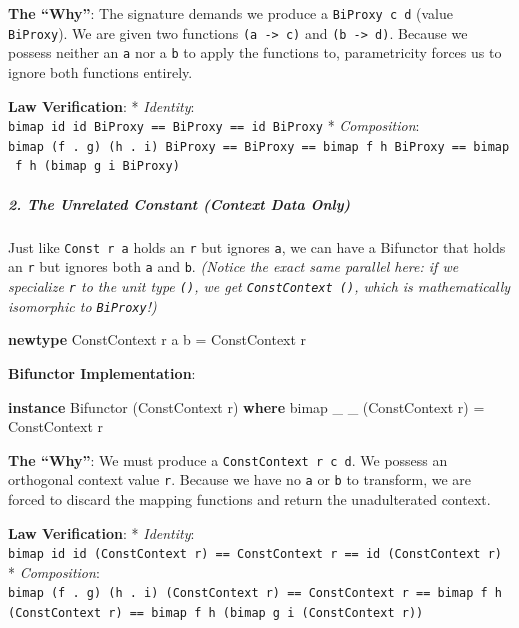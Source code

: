 \documentclass[
]{article}
\newenvironment{Shaded}{}{}
\newcommand{\DataTypeTok}[1]{\textcolor[rgb]{0.56,0.13,0.00}{#1}}
\newcommand{\KeywordTok}[1]{\textcolor[rgb]{0.00,0.44,0.13}{\textbf{#1}}}
\newcommand{\NormalTok}[1]{#1}
\newcommand{\OtherTok}[1]{\textcolor[rgb]{0.00,0.44,0.13}{#1}}
\begin{document}
\textbf{The ``Why''}: The signature demands we produce a
\texttt{BiProxy\ c\ d} (value \texttt{BiProxy}). We are given two
functions \texttt{(a\ -\textgreater{}\ c)} and
\texttt{(b\ -\textgreater{}\ d)}. Because we possess neither an
\texttt{a} nor a \texttt{b} to apply the functions to, parametricity
forces us to ignore both functions entirely.

\textbf{Law Verification}: * \emph{Identity}:
\texttt{bimap\ id\ id\ BiProxy\ ==\ BiProxy\ ==\ id\ BiProxy} *
\emph{Composition}:
\texttt{bimap\ (f\ .\ g)\ (h\ .\ i)\ BiProxy\ ==\ BiProxy\ ==\ bimap\ f\ h\ BiProxy\ ==\ bimap\ f\ h\ (bimap\ g\ i\ BiProxy)}

\subparagraph{2. The Unrelated Constant (Context Data
Only)}\label{the-unrelated-constant-context-data-only}

Just like \texttt{Const\ r\ a} holds an \texttt{r} but ignores
\texttt{a}, we can have a Bifunctor that holds an \texttt{r} but ignores
both \texttt{a} and \texttt{b}. \emph{(Notice the exact same parallel
here: if we specialize \texttt{r} to the unit type \texttt{()}, we get
\texttt{ConstContext\ ()}, which is mathematically isomorphic to
\texttt{BiProxy}!)}

\begin{Shaded}
\begin{Highlighting}[]
\KeywordTok{newtype} \DataTypeTok{ConstContext}\NormalTok{ r a b }\OtherTok{=} \DataTypeTok{ConstContext}\NormalTok{ r}
\end{Highlighting}
\end{Shaded}

\textbf{Bifunctor Implementation}:

\begin{Shaded}
\begin{Highlighting}[]
\KeywordTok{instance} \DataTypeTok{Bifunctor}\NormalTok{ (}\DataTypeTok{ConstContext}\NormalTok{ r) }\KeywordTok{where}
\NormalTok{    bimap \_ \_ (}\DataTypeTok{ConstContext}\NormalTok{ r) }\OtherTok{=} \DataTypeTok{ConstContext}\NormalTok{ r}
\end{Highlighting}
\end{Shaded}

\textbf{The ``Why''}: We must produce a \texttt{ConstContext\ r\ c\ d}.
We possess an orthogonal context value \texttt{r}. Because we have no
\texttt{a} or \texttt{b} to transform, we are forced to discard the
mapping functions and return the unadulterated context.

\textbf{Law Verification}: * \emph{Identity}:
\texttt{bimap\ id\ id\ (ConstContext\ r)\ ==\ ConstContext\ r\ ==\ id\ (ConstContext\ r)}
* \emph{Composition}:
\texttt{bimap\ (f\ .\ g)\ (h\ .\ i)\ (ConstContext\ r)\ ==\ ConstContext\ r\ ==\ bimap\ f\ h\ (ConstContext\ r)\ ==\ bimap\ f\ h\ (bimap\ g\ i\ (ConstContext\ r))}
\end{document}
